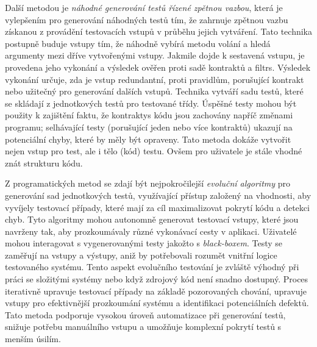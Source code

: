 \documentclass[czech, ma, kiv, he, iso690alph, pdf, viewonly]{fasthesis}
\begin{document}
        Další metodou je \textit{náhodné generování testů řízené zpětnou vazbou}, která je vylepšením pro generování náhodných testů tím, že zahrnuje zpětnou vazbu získanou z provádění testovacích vstupů v průběhu jejich vytváření. Tato technika postupně buduje vstupy tím, že náhodně vybírá metodu volání a hledá argumenty mezi dříve vytvořenými vstupy. Jakmile dojde k sestavená vstupu, je provedena jeho vykonání a výsledek ověřen proti sadě \gls{kontrakt}ů a \glspl{filtr}. Výsledek vykonání určuje, zda je vstup redundantní, proti pravidlům, porušující \gls{kontrakt} nebo užitečný pro generování dalších vstupů. Technika vytváří sadu testů, které se skládají z jednotkových testů pro testované třídy. Úspěšné testy mohou být použity k zajištění faktu, že \glspl{kontrakty} kódu jsou zachovány napříč změnami programu; selhávající testy (porušující jeden nebo více kontraktů) ukazují na potenciální chyby, které by měly být opraveny. Tato metoda dokáže vytvořit nejen vstup pro test, ale i tělo (kód) testu. Ovšem pro uživatele je stále vhodné znát strukturu kódu. \cite{FeedbackDirectedRT}

        Z programatických metod se zdají být nejpokročilejší \emph{evoluční algoritmy} pro generování sad jednotkových testů, využívající přístup založený na vhodnosti, aby vyvíjely testovací případy, které mají za cíl maximalizovat pokrytí kódu a detekci chyb. Tyto algoritmy mohou autonomně generovat testovací vstupy, které jsou navrženy tak, aby prozkoumávaly různé vykonávací cesty v aplikaci. Uživatelé mohou interagovat s vygenerovanými testy jakožto s \textit{black-boxem}. Testy se zaměřují na vstupy a výstupy, aniž by potřebovali rozumět vnitřní logice testovaného systému. Tento aspekt evolučního testování je zvláště výhodný při práci se složitými systémy nebo když zdrojový kód není snadno dostupný. Proces iterativně upravuje testovací případy na základě pozorovaných chování, upravuje vstupy pro efektivnější prozkoumání systému a identifikaci potenciálních defektů. Tato metoda podporuje vysokou úroveň automatizace při generování testů, snižuje potřebu manuálního vstupu a umožňuje komplexní pokrytí testů s menším úsilím. \cite{CAMPOS2018207} \cite{abs-2111-05003}
\end{document}
